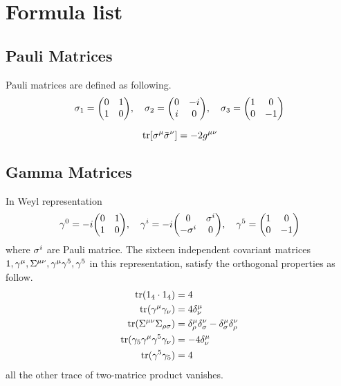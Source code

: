 \chapter{Formula list}

\section{Pauli Matrices}

Pauli matrices are defined as following.
\begin{equation} 
  \s_1 = \mqty( 0 & 1 \\
                1 & 0),\quad
  \s_2 = \mqty( 0 & -i \\
                i & 0),\quad
  \s_3 = \mqty( 1 & 0 \\
                0 & -1)
\end{equation}

\begin{equation} \label{eq:pauli-matrices-1}
  \operatorname{tr}[\sigma^{\mu}\bar{\sigma}^{\nu}] = -2 g^{\mu\nu}
\end{equation}

\section{Gamma Matrices}

In Weyl representation
\begin{equation} 
  \g^0 = -i\mqty(  0 & 1\\
                   1 &  0),\quad
  \g^i = -i\mqty(  0 &  \s^{i}\\
            -\s^{i}&   0   ),\quad
  \g^5 = \mqty(  1 &  0\\
                 0 & -1)
\end{equation}
where $\sigma^i$ are Pauli matrice.
The sixteen independent covariant matrices $1,\gamma^{\mu},\Sigma^{\mu\nu},\gamma^{\mu}\gamma^5,\gamma^5$ in this representation, satisfy the orthogonal properties as follow.
\begin{align}\label{orthogonal property of 16 covariant matrices}
  \text{tr}(1_{4}\cdot1_{4}) &= 4\notag\\
  \text{tr}(\gamma^{\mu}\gamma_{\nu}) &= 4\delta^{\mu}_{\nu}\notag\\
  \text{tr}(\Sigma^{\mu\nu}\Sigma_{\rho\sigma}) 
  &= \delta^{\mu}_{\rho}\delta^{\nu}_{\sigma}-\delta^{\mu}_{\sigma}\delta^{\nu}_{\rho}\\
   \text{tr}(\gamma_5\gamma^{\mu}\gamma^{5}\gamma_{\nu}) &= -4 \delta^{\mu}_{\nu}\notag\\
   \text{tr}(\gamma^{5}\gamma_{5}) &= 4\notag
\end{align}
all the other trace of two-matrice product vanishes. 

